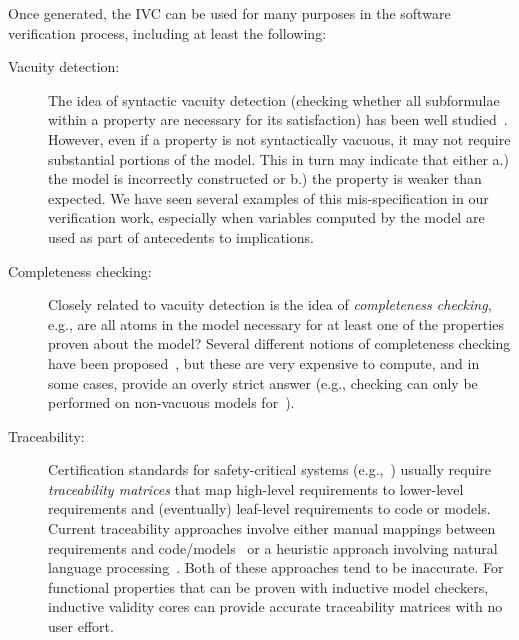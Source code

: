 Once generated, the IVC can be used for many purposes in the software verification process, including at least the following:
\begin{description}
    \item[Vacuity detection:] The idea of syntactic vacuity detection (checking whether all subformulae within a property are necessary for its satisfaction) has been well studied~\cite{Kupferman03:Vacuity}.   However, even if a property is not syntactically vacuous, it may not require substantial portions of the model.  This in turn may indicate that either a.) the model is incorrectly constructed or b.) the property is weaker than expected.  We have seen several examples of this mis-specification in our verification work, especially when variables computed by the model are used as part of antecedents to implications.
    \item[Completeness checking:] Closely related to vacuity detection is the idea of {\em completeness checking}, e.g., are all atoms in the model necessary for at least one of the properties proven about the model?  Several different notions of completeness checking have been proposed~\cite{chockler_coverage_2003, kupferman_theory_2008}, but these are very expensive to compute, and in some cases, provide an overly strict answer (e.g., checking can only be performed on non-vacuous models for~\cite{kupferman_theory_2008}). %
    \item[Traceability:] Certification standards for safety-critical systems (e.g.,~\cite{DO178C, MOD:00-55}) usually require {\em traceability matrices} that map high-level requirements to lower-level requirements and (eventually) leaf-level requirements to code or models.  Current traceability approaches involve either manual mappings between requirements and code/models~\cite{SimulinkTraceability} or a heuristic approach involving natural language processing~\cite{Keenan12:Tracelab}.  Both of these approaches tend to be inaccurate.  For functional properties that can be proven with inductive model checkers, inductive validity cores can provide accurate traceability matrices with no user effort.

\end{description}
